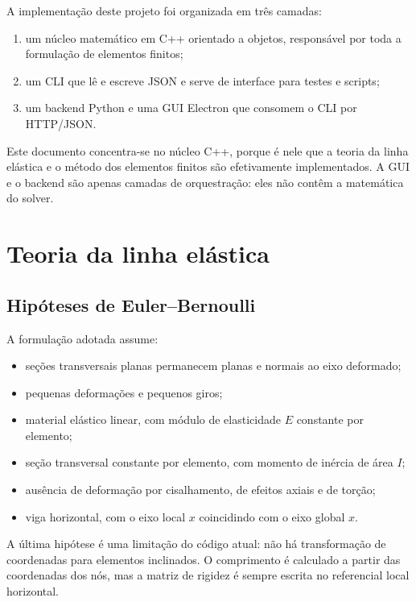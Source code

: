 \documentclass[12pt,a4paper]{article}
\begin{document}
A implementação deste projeto foi organizada em três camadas:

\begin{enumerate}[leftmargin=1.5em]
  \item um núcleo matemático em C++ orientado a objetos, responsável por toda a formulação de elementos finitos;
  \item um CLI que lê e escreve JSON e serve de interface para testes e scripts;
  \item um backend Python e uma GUI Electron que consomem o CLI por HTTP/JSON.
\end{enumerate}

Este documento concentra-se no núcleo C++, porque é nele que a teoria da linha elástica e o método dos elementos finitos são efetivamente implementados. A GUI e o backend são apenas camadas de orquestração: eles não contêm a matemática do solver.

\section{Teoria da linha elástica}
\label{sec:teoria}

\subsection{Hipóteses de Euler--Bernoulli}

A formulação adotada assume:

\begin{itemize}[leftmargin=1.5em]
  \item seções transversais planas permanecem planas e normais ao eixo deformado;
  \item pequenas deformações e pequenos giros;
  \item material elástico linear, com módulo de elasticidade \(E\) constante por elemento;
  \item seção transversal constante por elemento, com momento de inércia de área \(I\);
  \item ausência de deformação por cisalhamento, de efeitos axiais e de torção;
  \item viga horizontal, com o eixo local \(x\) coincidindo com o eixo global \(x\).
\end{itemize}

A última hipótese é uma limitação do código atual: não há transformação de coordenadas para elementos inclinados. O comprimento é calculado a partir das coordenadas dos nós, mas a matriz de rigidez é sempre escrita no referencial local horizontal.
\end{document}
